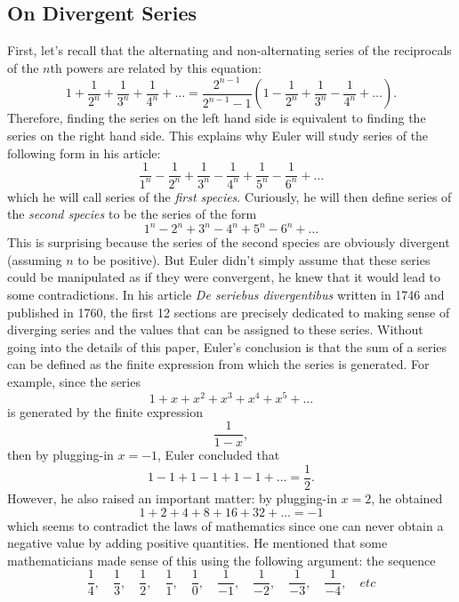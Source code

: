 \subsection*{On Divergent Series}

First, let's recall that the alternating and non-alternating series of the reciprocals of the $n$th powers are related by this equation:
\begin{equation} \label{direct sum in terms of alterne}
    1 + \frac{1}{2^n} + \frac{1}{3^n} + \frac{1}{4^n} + \dots = \frac{2^{n-1}}{2^{n-1} - 1}\left(1 - \frac{1}{2^n} + \frac{1}{3^n} - \frac{1}{4^n} + \dots\right).
\end{equation}
Therefore, finding the series on the left hand side is equivalent to finding the series on the right hand side. This explains why Euler will study series of the following form in his article:
$$\frac{1}{1^n} - \frac{1}{2^n} + \frac{1}{3^n} - \frac{1}{4^n} + \frac{1}{5^n} - \frac{1}{6^n} + \dots$$
which he will call series of the \textit{first species}. Curiously, he will then define series of the \textit{second species} to be the series of the form 
$$1^n - 2^n + 3^n - 4^n + 5^n - 6^n + \dots$$
This is surprising because the series of the second species are obviously divergent (assuming $n$ to be positive). But Euler didn't simply assume that these series could be manipulated as if they were convergent, he knew that it would lead to some contradictions. In his article \textit{De seriebus divergentibus} \cite{eulerE247} written in 1746 and published in 1760, the first 12 sections are precisely dedicated to making sense of diverging series and the values that can be assigned to these series. Without going into the details of this paper, Euler's conclusion is that the sum of a series can be defined as the finite expression from which the series is generated. For example, since the series
$$1 + x + x^2 + x^3 + x^4 + x^5 + \dots$$
is generated by the finite expression
$$\frac{1}{1-x},$$
then by plugging-in $x = -1$, Euler concluded that
$$1 - 1 + 1 - 1 + 1 - 1 + \dots = \frac{1}{2}.$$
However, he also raised an important matter: by plugging-in $x = 2$, he obtained
$$1 + 2 + 4 + 8 + 16 + 32 + \dots = -1$$
which seems to contradict the laws of mathematics since one can never obtain a negative value by adding positive quantities. He mentioned that some mathematicians made sense of this using the following argument: the sequence
$$\frac{1}{4}, \quad \frac{1}{3}, \quad \frac{1}{2}, \quad \frac{1}{1}, \quad \frac{1}{0}, \quad \frac{1}{-1}, \quad \frac{1}{-2}, \quad \frac{1}{-3}, \quad \frac{1}{-4}, \quad etc$$
